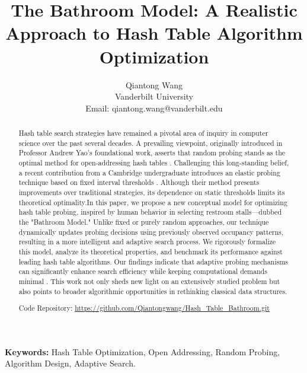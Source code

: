 \documentclass[letterpaper]{article}
\begin{document}
\title{\textbf{The Bathroom Model: A Realistic Approach to Hash Table Algorithm Optimization}}
\author{
    Qiantong Wang \\
    Vanderbilt University \\
    Email: qiantong.wang@vanderbilt.edu
}
\maketitle



\begin{abstract}
Hash table search strategies have remained a pivotal area of inquiry in computer science over the past several decades. A prevailing viewpoint, originally introduced in Professor Andrew Yao’s foundational work, asserts that random probing stands as the optimal method for open-addressing hash tables \cite{yao1981}. Challenging this long-standing belief, a recent contribution from a Cambridge undergraduate introduces an elastic probing technique based on fixed interval thresholds \cite{farach2024}. Although their method presents improvements over traditional strategies, its dependence on static thresholds limits its theoretical optimality.In this paper, we propose a new conceptual model for optimizing hash table probing, inspired by human behavior in selecting restroom stalls—dubbed the "Bathroom Model." Unlike fixed or purely random approaches, our technique dynamically updates probing decisions using previously observed occupancy patterns, resulting in a more intelligent and adaptive search process. We rigorously formalize this model, analyze its theoretical properties, and benchmark its performance against leading hash table algorithms. Our findings indicate that adaptive probing mechanisms can significantly enhance search efficiency while keeping computational demands minimal \cite{cormen2009,mitzenmacher2005,knuth1998}. This work not only sheds new light on an extensively studied problem but also points to broader algorithmic opportunities in rethinking classical data structures.

Code Repository: \url{https://github.com/Qiantongwang/Hash_Table_Bathroom.git}
\end{abstract}

\textbf{Keywords:} Hash Table Optimization, Open Addressing, Random Probing, Algorithm Design, Adaptive Search.
\end{document}
